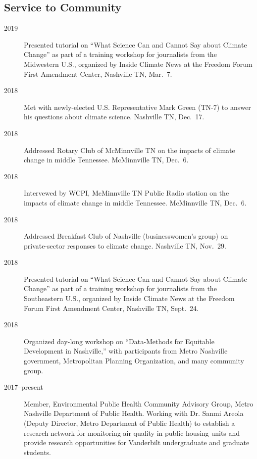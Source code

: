 \documentclass[10pt]{article}
\begin{document}
	\subsection{Service to Community}
    	\begin{description}
            \item[2019] Presented tutorial on ``What Science Can and Cannot Say about Climate Change'' as part of a training workshop for journalists from the Midwestern U.S., organized by Inside Climate News at the Freedom Forum First Amendment Center, Nashville TN, Mar.~7.
            \item[2018]  Met with newly-elected U.S. Representative Mark Green (TN-7) to answer his questions about climate science. Nashville TN, Dec.\ 17.
            \item[2018] Addressed Rotary Club of McMinnville TN on the impacts of climate change in middle Tennessee. McMinnville TN, Dec.\ 6.
            \item[2018] Intervewed by WCPI, McMinnville TN Public Radio station on the impacts of climate change in middle Tennessee. McMinnville TN, Dec.\ 6.
            \item[2018] Addressed Breakfast Club of Nashville (businesswomen's group) on private-sector responses to climate change. Nashville TN, Nov.\ 29. 
            \item[2018] Presented tutorial on ``What Science Can and Cannot Say about Climate Change'' as part of a training workshop for journalists from the Southeastern U.S., organized by Inside Climate News at the Freedom Forum First Amendment Center, Nashville TN, Sept.~24.
    		\item[2018] Organized day-long workshop on ``Data-Methods for Equitable Development in Nashville,'' with participants from Metro Nashville government, Metropolitan Planning Organization,
    		and many community group.
            \item[2017--present] Member, Environmental Public Health Community Advisory Group, Metro Nashville Department of Public Health. Working with Dr. Sanmi Areola (Deputy Director, Metro Department of Public Health)
            to establish a research network for monitoring air quality in public housing units and provide research opportunities for Vanderbilt undergraduate and graduate students.

\end{description}
\end{document}
